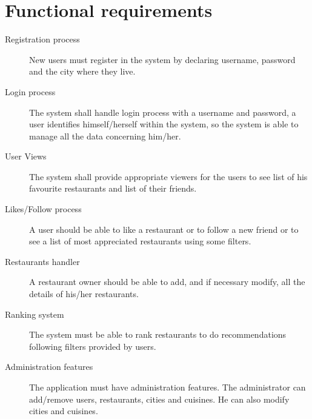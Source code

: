 \section{Functional requirements}\label{sec:functionalrequirements}

\begin{description}
	\item[Registration process] New users must register in the system by
		declaring username, password  and the city where they live.
	\item[Login process] The system shall handle login process with a
		username and password, a user identifies himself/herself within
		the system, so the system is able to manage all the data
		concerning him/her.
	\item[User Views] The system shall provide appropriate viewers for the
		users to see list of his favourite restaurants and list of their
		friends.
	\item[Likes/Follow process] A user should be able to like a restaurant
		or to follow a new friend or to see a list of most appreciated
		restaurants using some filters.
	\item[Restaurants handler] A restaurant owner should be able to add, and
		if necessary modify, all the details of his/her restaurants.
	\item[Ranking system] The system must be able to rank restaurants to do
		recommendations following filters provided by users.
	\item[Administration features] The application must have administration
		features. The administrator can add/remove users, restaurants,
		cities and cuisines. He can also modify cities and cuisines.
\end{description}

